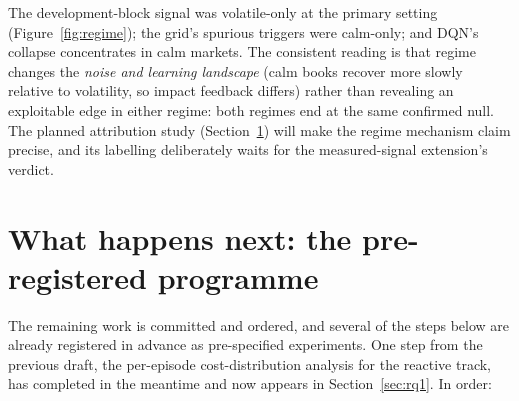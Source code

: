 \documentclass[11pt]{article}
\begin{document}
The development-block signal was volatile-only at the primary setting
(Figure~\ref{fig:regime}); the grid's spurious triggers were calm-only; and DQN's collapse
concentrates in calm markets. The consistent reading is that regime changes the
\emph{noise and learning landscape} (calm books recover more slowly relative to
volatility, so impact feedback differs) rather than revealing an exploitable edge in either
regime: both regimes end at the same confirmed null. The planned attribution study
(Section~\ref{sec:next}) will make the regime mechanism claim precise, and its labelling
deliberately waits for the measured-signal extension's verdict.

\section{What happens next: the pre-registered programme}\label{sec:next}

The remaining work is committed and ordered, and several of the steps below are already
registered in advance as pre-specified experiments. One step from the previous draft, the
per-episode cost-distribution analysis for the reactive track, has completed in the
meantime and now appears in Section~\ref{sec:rq1}. In order:
\end{document}
